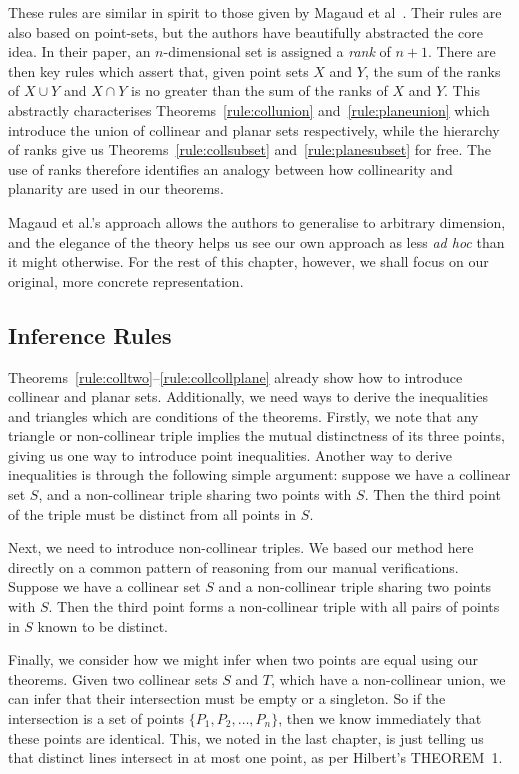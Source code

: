 These rules are similar in spirit to those given by Magaud et al~\cite{RankDesargues}. Their rules are also based on point-sets, but the authors have beautifully abstracted the core idea. In their paper, an $n$-dimensional set is assigned a \emph{rank} of $n+1$. There are then key rules which assert that, given point sets $X$ and $Y$, the sum of the ranks of $X \cup Y$ and $X \cap Y$ is no greater than the sum of the ranks of $X$ and $Y$. This abstractly characterises Theorems~\ref{rule:collunion} and~\ref{rule:planeunion} which introduce the union of collinear and planar sets respectively, while the hierarchy of ranks give us Theorems~\ref{rule:collsubset} and~\ref{rule:planesubset} for free. The use of ranks therefore identifies an analogy between how collinearity and planarity are used in our theorems.

Magaud et al.'s approach allows the authors to generalise to arbitrary dimension, and the elegance of the theory helps us see our own approach as less \emph{ad hoc} than it might otherwise. For the rest of this chapter, however, we shall focus on our original, more concrete representation.

\subsection{Inference Rules}\label{list:Procedures}
Theorems~\ref{rule:colltwo}--\ref{rule:collcollplane} already show how to introduce collinear and planar sets. Additionally, we need ways to derive the inequalities and triangles which are conditions of the theorems. Firstly, we note that any triangle or non-collinear triple implies the mutual distinctness of its three points, giving us one way to introduce point inequalities. Another way to derive inequalities is through the following simple argument: suppose we have a collinear set $S$, and a non-collinear triple sharing two points with $S$. Then the third point of the triple must be distinct from all points in $S$. 

Next, we need to introduce non-collinear triples. We based our method here directly on a common pattern of reasoning from our manual verifications. Suppose we have a collinear set $S$ and a non-collinear triple sharing two points with $S$. Then the third point forms a non-collinear triple with all pairs of points in $S$ known to be distinct.

Finally, we consider how we might infer when two points are equal using our theorems. Given two collinear sets $S$ and $T$, which have a non-collinear union, we can infer that their intersection must be empty or a singleton. So if the intersection is a set of points $\{P_1,P_2,\ldots,P_n\}$, then we know immediately that these points are identical. This, we noted in the last chapter, is just telling us that distinct lines intersect in at most one point, as per Hilbert's THEOREM~1.

